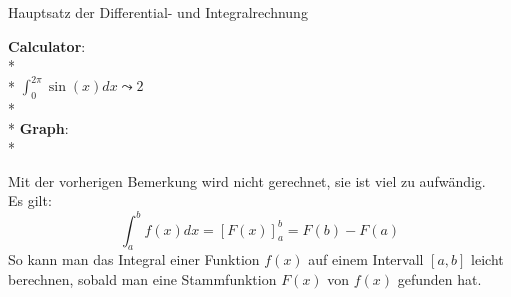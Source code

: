 \begin{bla}{Hauptsatz der Differential- und Integralrechnung}
  \begin{marginfigure}
    \begin{tcolorbox}[colback=white!95!black,colframe=white!75!black,title=CAS:,arc=0mm]
      \begin{scriptsize}
        \textbf{Calculator}: \\*
         \\*
        \hfill \( \int_0^{2\pi}\sin(x) dx \leadsto 2 \) \\* \ \\*
        \textbf{Graph}: \\*
      \end{scriptsize}
    \end{tcolorbox}
  \end{marginfigure}
  Mit der vorherigen Bemerkung wird nicht gerechnet, sie ist viel zu aufwändig. \\
  Es gilt:
  \begin{equation*}
    \int_a^b f(x)dx={[F(x)]}_a^b=F(b)-F(a)
  \end{equation*}
  So kann man das Integral einer Funktion $f(x)$ auf einem Intervall $[a,b]$ leicht berechnen, sobald man eine Stammfunktion $F(x)$ von $f(x)$ gefunden hat.
\end{bla}

